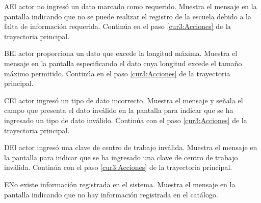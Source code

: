  \begin{UCtrayectoriaA}{A}{El actor no ingresó un dato marcado como requerido.}
    \UCpaso[\UCsist] Muestra el mensaje  en la pantalla  indicando que no se puede realizar el registro de la escuela debido a la falta de información requerida.
   \UCpaso[] Continúa en el paso \ref{cur3:Acciones} de la trayectoria principal.
 \end{UCtrayectoriaA}

 \begin{UCtrayectoriaA}{B}{El actor proporciona un dato que excede la longitud máxima.}
    \UCpaso[\UCsist] Muestra el mensaje  en la pantalla  especificando el dato cuya longitud excede el tamaño máximo permitido.
   \UCpaso[] Continúa en el paso \ref{cur3:Acciones} de la trayectoria principal.
 \end{UCtrayectoriaA}
 
 \begin{UCtrayectoriaA}{C}{El actor ingresó un tipo de dato incorrecto.}
    \UCpaso[\UCsist] Muestra el mensaje  y señala el campo que presenta el dato inválido en la 
    pantalla  para indicar que se ha ingresado un tipo de dato inválido.
    \UCpaso[] Continúa con el paso \ref{cur3:Acciones} de la trayectoria principal.
 \end{UCtrayectoriaA}

 \begin{UCtrayectoriaA}{D}{El actor ingresó una clave de centro de trabajo inválida.}
    \UCpaso[\UCsist] Muestra el mensaje  en la 
    pantalla  para indicar que se ha ingresado una clave de centro de trabajo inválida.
    \UCpaso[] Continúa con el paso \ref{cur3:Acciones} de la trayectoria principal.
 \end{UCtrayectoriaA}

 \begin{UCtrayectoriaA}{E}{No existe información registrada en el sistema.}
    \UCpaso[\UCsist] Muestra el mensaje  en la pantalla  indicando que no hay información registrada en el catálogo.
  \end{UCtrayectoriaA}

